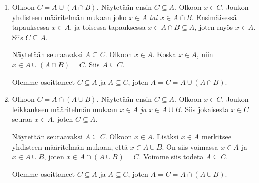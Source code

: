 \documentclass[12pt,a4paper]{article}
\begin{document}
\begin{solution}
\leavevmode\par
\begin{enumerate}[label=\alph*), nosep]
\item Olkoon \(C = A \cup (A \cap B)\). Näytetään ensin \(C \subseteq A\).
Olkoon \(x \in C\). Joukon yhdisteen määritelmän mukaan joko \(x \in
A\) \emph{tai} \(x \in A \cap B\).
Ensimäisessä tapauksessa \(x \in A\), ja toisessa tapauksessa
\(x \in A \cap B \subseteq A\), joten myös \(x \in A\). Siis \(C \subseteq A\).

Näytetään seuraavaksi \(A \subseteq C\). Olkoon \(x \in A\).
Koska \(x \in A\), niin \(x \in A \cup (A \cap B) = C\).
Siis \(A \subseteq C\).

Olemme osoittaneet \(C \subseteq A\) ja \(A \subseteq C\), joten
\(A = C = A \cup (A \cap B)\).

\item Olkoon \(C = A \cap (A \cup B)\). Näytetään ensin \(C \subseteq A\).
Olkoon \(x \in C\). Joukon leikkauksen määritelmän mukaan \(x \in A\) \emph{ja}
\(x \in A \cup B\). Siis jokaisesta \(x \in C\) seuraa \(x \in A\), joten
\(C \subseteq A\).

Näytetään seuraavaksi \(A \subseteq C\). Olkoon \(x \in A\). Lisäksi
\(x \in A\) merkitsee yhdisteen määritelmän mukaan, että \(x \in A \cup B\).
On siis voimassa \(x \in A\) ja \(x \in A \cup B\), joten
\(x \in A \cap (A \cup B) = C\). Voimme siis todeta \(A \subseteq C\).

Olemme osoittaneet \(C \subseteq A\) ja \(A \subseteq C\), joten
\(A = C = A \cap (A \cup B)\).
\end{enumerate}

\begin{center}
\begin{minipage}{\textwidth}
\centering
{}
\end{minipage}
\end{center}
\end{solution}
\end{document}
